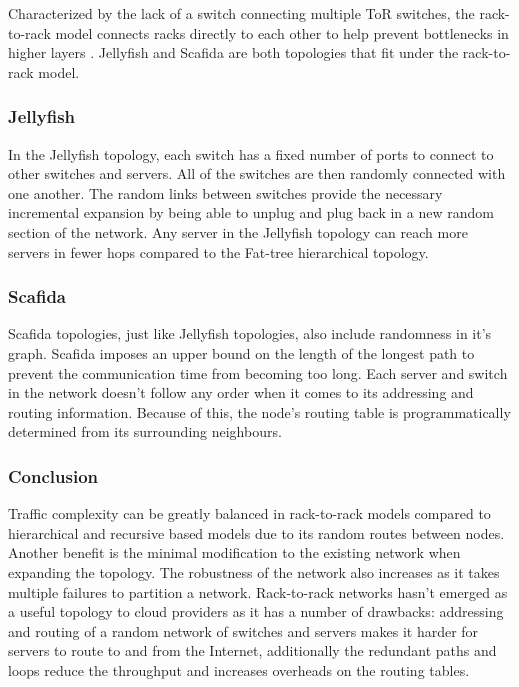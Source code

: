 \documentclass[12pt]{article}
\begin{document}
Characterized by the lack of a switch connecting multiple ToR switches, the rack-to-rack model connects racks directly to each other to help prevent bottlenecks in higher layers \cite{wang2015survey, xia2016survey}. Jellyfish \cite{singla2012jellyfish} and Scafida \cite{gyarmati2010scafida} are both topologies that fit under the rack-to-rack model.


\subsubsection{Jellyfish} \label{subp:jellyfish}

In the Jellyfish topology, each switch has a fixed number of ports to connect to other switches and servers. All of the switches are then randomly connected with one another. The random links between switches provide the necessary incremental expansion by being able to unplug and plug back in a new random section of the network. Any server in the Jellyfish topology can reach more servers in fewer hops compared to the Fat-tree hierarchical topology.


\subsubsection{Scafida} \label{subp:scafida}

Scafida topologies, just like Jellyfish topologies, also include randomness in it's graph. Scafida imposes an upper bound on the length of the longest path to prevent the communication time from becoming too long. Each server and switch in the network doesn't follow any order when it comes to its addressing and routing information. Because of this, the node's routing table is programmatically determined from its surrounding neighbours.



\subsubsection{Conclusion} \label{ssub:rack-concl}


Traffic complexity can be greatly balanced in rack-to-rack models compared to hierarchical and recursive based models due to its random routes between nodes. Another benefit is the minimal modification to the existing network when expanding the topology. The robustness of the network also increases as it takes multiple failures to partition a network. Rack-to-rack networks hasn't emerged as a useful topology to cloud providers as it has a number of drawbacks: addressing and routing of a random network of switches and servers makes it harder for servers to route to and from the Internet, additionally the redundant paths and loops reduce the throughput and increases overheads on the routing tables.
\end{document}
